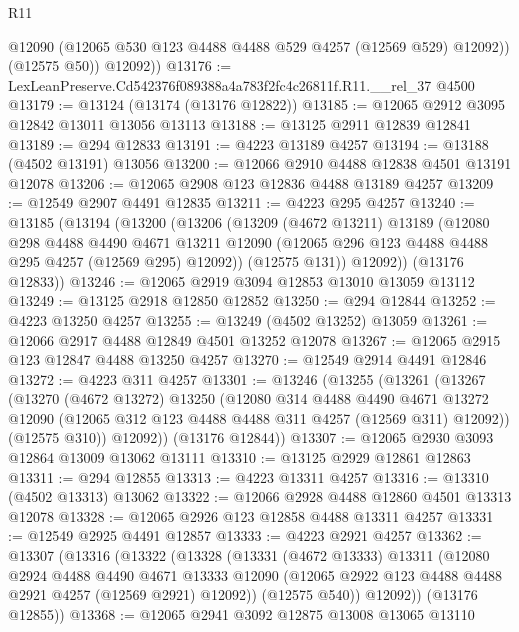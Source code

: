 \begin{lexlean}{R11}
\begin{coremodule}
            @12090
            (@12065 @530 @123 @4488 @4488 @529 @4257 (@12569 @529) @12092))
          (@12575 @50))
        @12092))
@13176 := LexLeanPreserve.Cd542376f089388a4a783f2fc4c26811f.R11.__rel_37 @4500
@13179 := @13124 (@13174 (@13176 @12822))
@13185 := @12065 @2912 @3095 @12842 @13011 @13056 @13113
@13188 := @13125 @2911 @12839 @12841
@13189 := @294 @12833
@13191 := @4223 @13189 @4257
@13194 := @13188 (@4502 @13191) @13056
@13200 := @12066 @2910 @4488 @12838 @4501 @13191 @12078
@13206 := @12065 @2908 @123 @12836 @4488 @13189 @4257
@13209 := @12549 @2907 @4491 @12835
@13211 := @4223 @295 @4257
@13240 := @13185
    (@13194
      (@13200
        (@13206
          (@13209
            (@4672 @13211)
            @13189
            (@12080
              @298
              @4488
              @4490
              @4671
              @13211
              @12090
              (@12065 @296 @123 @4488 @4488 @295 @4257 (@12569 @295) @12092))
            (@12575 @131))
          @12092))
      (@13176 @12833))
@13246 := @12065 @2919 @3094 @12853 @13010 @13059 @13112
@13249 := @13125 @2918 @12850 @12852
@13250 := @294 @12844
@13252 := @4223 @13250 @4257
@13255 := @13249 (@4502 @13252) @13059
@13261 := @12066 @2917 @4488 @12849 @4501 @13252 @12078
@13267 := @12065 @2915 @123 @12847 @4488 @13250 @4257
@13270 := @12549 @2914 @4491 @12846
@13272 := @4223 @311 @4257
@13301 := @13246
    (@13255
      (@13261
        (@13267
          (@13270
            (@4672 @13272)
            @13250
            (@12080
              @314
              @4488
              @4490
              @4671
              @13272
              @12090
              (@12065 @312 @123 @4488 @4488 @311 @4257 (@12569 @311) @12092))
            (@12575 @310))
          @12092))
      (@13176 @12844))
@13307 := @12065 @2930 @3093 @12864 @13009 @13062 @13111
@13310 := @13125 @2929 @12861 @12863
@13311 := @294 @12855
@13313 := @4223 @13311 @4257
@13316 := @13310 (@4502 @13313) @13062
@13322 := @12066 @2928 @4488 @12860 @4501 @13313 @12078
@13328 := @12065 @2926 @123 @12858 @4488 @13311 @4257
@13331 := @12549 @2925 @4491 @12857
@13333 := @4223 @2921 @4257
@13362 := @13307
    (@13316
      (@13322
        (@13328
          (@13331
            (@4672 @13333)
            @13311
            (@12080
              @2924
              @4488
              @4490
              @4671
              @13333
              @12090
              (@12065 @2922 @123 @4488 @4488 @2921 @4257 (@12569 @2921) @12092))
            (@12575 @540))
          @12092))
      (@13176 @12855))
@13368 := @12065 @2941 @3092 @12875 @13008 @13065 @13110

\end{coremodule}
\end{lexlean}
